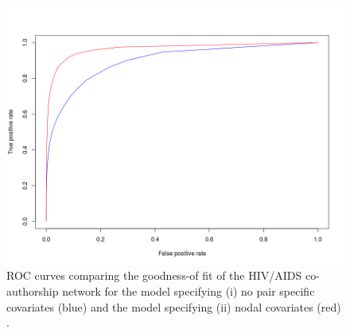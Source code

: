 \begin{figure}[!h]
\centering
\includegraphics[scale=0.5]{Chapters/hiv/statMod/lnm_ROC_nullVSallNodal.png}
\caption{ROC curves comparing the goodness-of fit of the HIV/AIDS co-authorship network for the model specifying (i) no pair specific covariates (blue) and the model specifying (ii) nodal covariates (red)%
.}
\label{fig:hiv_lnm_roc}
\end{figure}~\\~\\

\pagebreak
